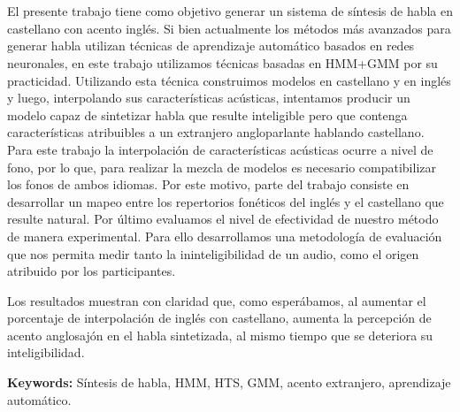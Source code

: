 \chapter*{\runtitle}

El presente trabajo tiene como objetivo generar un sistema de síntesis de habla en castellano con acento inglés. Si bien actualmente los métodos más avanzados para generar habla utilizan técnicas de aprendizaje automático basados en redes neuronales, en este trabajo utilizamos técnicas basadas en HMM+GMM por su practicidad. Utilizando esta técnica construimos modelos en castellano y en inglés y luego, interpolando sus características acústicas, intentamos producir un modelo capaz de sintetizar habla que resulte inteligible pero que contenga características atribuibles a un extranjero angloparlante hablando castellano. Para este trabajo la interpolación de características acústicas ocurre a nivel de fono, por lo que, para realizar la mezcla de modelos es necesario compatibilizar los fonos de ambos idiomas. Por este motivo, parte del trabajo consiste en desarrollar un mapeo entre los repertorios fonéticos del inglés y el castellano que resulte natural. Por último evaluamos el nivel de efectividad de nuestro método de manera experimental. Para ello desarrollamos una metodología de evaluación que nos permita medir tanto la ininteligibilidad de un audio, como el origen atribuido por los participantes.

Los resultados muestran con claridad que, como esperábamos, al aumentar el porcentaje de interpolación de inglés con castellano, aumenta la percepción de acento anglosajón en el habla sintetizada, al mismo tiempo que se deteriora su inteligibilidad.

\bigskip

\noindent\textbf{Keywords:} Síntesis de habla, HMM, HTS, GMM, acento extranjero, aprendizaje automático.